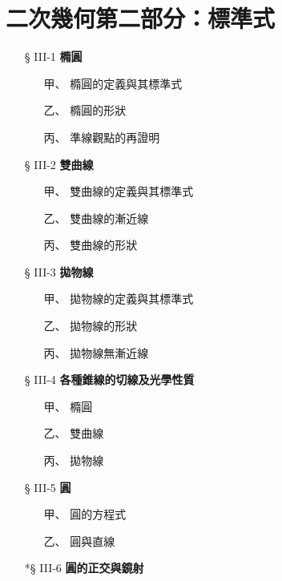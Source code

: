 
\section{二次幾何\texorpdfstring{\quad }{ }第二部分：標準式}
\label{sec:b4-ch3}

\begin{center}
\begin{minipage}{0.75\textwidth}
\begin{itemize}[leftmargin=2em, itemsep=0.3em]
  \item[§ III-1] \textbf{橢圓}
  \begin{itemize}[leftmargin=2em, itemsep=0.2em]
    \item[甲、] 橢圓的定義與其標準式
    \item[乙、] 橢圓的形狀
    \item[丙、] 準線觀點的再證明
  \end{itemize}
  \item[§ III-2] \textbf{雙曲線}
  \begin{itemize}[leftmargin=2em, itemsep=0.2em]
    \item[甲、] 雙曲線的定義與其標準式
    \item[乙、] 雙曲線的漸近線
    \item[丙、] 雙曲線的形狀
  \end{itemize}
  \item[§ III-3] \textbf{拋物線}
  \begin{itemize}[leftmargin=2em, itemsep=0.2em]
    \item[甲、] 拋物線的定義與其標準式
    \item[乙、] 拋物線的形狀
    \item[丙、] 拋物線無漸近線
  \end{itemize}
  \item[§ III-4] \textbf{各種錐線的切線及光學性質}
  \begin{itemize}[leftmargin=2em, itemsep=0.2em]
    \item[甲、] 橢圓
    \item[乙、] 雙曲線
    \item[丙、] 拋物線
  \end{itemize}
  \item[§ III-5] \textbf{圓}
  \begin{itemize}[leftmargin=2em, itemsep=0.2em]
    \item[甲、] 圓的方程式
    \item[乙、] 圓與直線
  \end{itemize}
  \item[*§ III-6] \textbf{圓的正交與鏡射}
\end{itemize}
\end{minipage}
\end{center}

